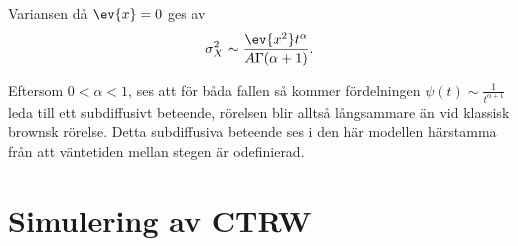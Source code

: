 Variansen då $\ev{x}=0$ ges av 
\begin{equation}
   \sigma_X^2 \sim \frac{\ev{x^2}t^{\alpha}}{A\Gamma (\alpha+1)}.
\end{equation}

Eftersom $0<\alpha<1$, ses att för båda fallen så kommer fördelningen $\psi(t)\sim \frac{1}{t^{\alpha+1}}$ leda till ett subdiffusivt beteende, rörelsen blir alltså långsammare än vid klassisk brownsk rörelse. Detta subdiffusiva beteende ses i den här modellen härstamma från att väntetiden mellan stegen är odefinierad. 

\section{Simulering av CTRW}


